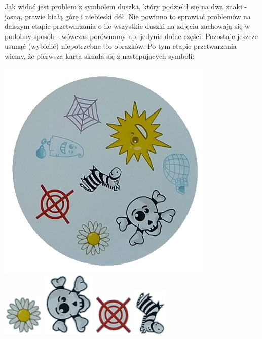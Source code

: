 \documentclass[10pt,a4paper]{article}
\begin{document}
Jak widać jest problem z symbolem duszka, który podzielił się na dwa znaki - jasną, prawie białą górę i niebieski dół. Nie powinno to sprawiać problemów na dalszym etapie przetwarzania o ile wszystkie duszki na zdjęciu zachowają się w podobny sposób - wówczas porównamy np. jedynie dolne części. Pozostaje jeszcze usunąć (wybielić) niepotrzebne tło obrazków. Po tym etapie przetwarzania wiemy, że pierwsza karta składa się z następujących symboli:
\begin{center}
\includegraphics[scale=0.4]{2.1/card0.jpg} \\
\includegraphics[scale=0.5]{2.1/card0sign0.jpg}
\includegraphics[scale=0.5]{2.1/card0sign1.jpg}
\includegraphics[scale=0.5]{2.1/card0sign2.jpg}
\includegraphics[scale=0.5]{2.1/card0sign3.jpg}

\end{center}
\end{document}
